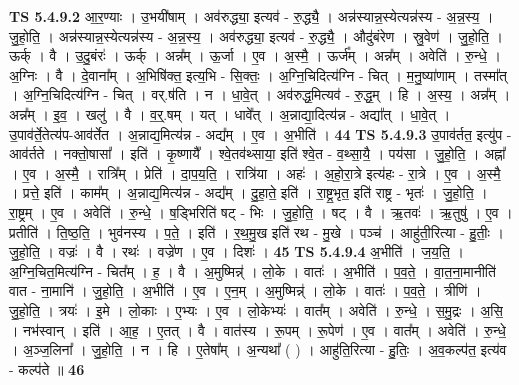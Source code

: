 \documentclass[17pt]{extarticle}
\begin{document}
                  \newline
                                \textbf{ TS 5.4.9.2} \newline
                  आ॒र॒ण्याः । उ॒भयी॑षाम् । अव॑रुद्ध्या॒ इत्यव॑ - रु॒द्ध्यै॒ । अन्न॑स्यान्न॒स्येत्यन्न॑स्य - अ॒न्न॒स्य॒ । जु॒हो॒ति॒ । अन्न॑स्यान्न॒स्येत्यन्न॑स्य - अ॒न्न॒स्य॒ । अव॑रुद्ध्या॒ इत्यव॑ - रु॒द्ध्यै॒ । औदु॑बंरेण । स्रु॒वेण॑ । जु॒हो॒ति॒ । ऊर्क् । वै । उ॒दु॒बंरः॑ । ऊर्क् । अन्न᳚म् । ऊ॒र्जा । ए॒व । अ॒स्मै॒ । ऊर्ज᳚म् । अन्न᳚म् । अवेति॑ । रु॒न्धे॒ । अ॒ग्निः । वै । दे॒वाना᳚म् । अ॒भिषि॑क्त॒ इत्य॒भि - सि॒क्तः॒ । अ॒ग्नि॒चिदित्य॑ग्नि - चित् । म॒नु॒ष्या॑णाम् । तस्मा᳚त् । अ॒ग्नि॒चिदित्य॑ग्नि - चित् । वर्.ष॑ति । न । धा॒वे॒त् । अव॑रुद्ध॒मित्यव॑ - रु॒द्ध॒म् । हि । अ॒स्य॒ । अन्न᳚म् । अन्न᳚म् । इ॒व॒ । खलु॑ । वै । व॒र्॒.षम् । यत् । धावे᳚त् । अ॒न्नाद्या॒दित्य॑न्न - अद्या᳚त् । धा॒वे॒त् । उ॒पाव॑र्ते॒तेत्य॑प-आव॑र्तेत । अ॒न्नाद्य॒मित्य॑न्न - अद्य᳚म् । ए॒व । अ॒भीति॑ । \textbf{  44} \newline
                  \newline
                                \textbf{ TS 5.4.9.3} \newline
                  उ॒पाव॑र्तत॒ इत्यु॑प - आव॑र्तते । नक्तो॒षासा᳚ । इति॑ । कृ॒ष्णायै᳚ । श्वे॒तव॑थ्साया॒ इति॑ श्वे॒त - व॒थ्सा॒यै॒ । पय॑सा । जु॒हो॒ति॒ । अह्ना᳚ । ए॒व । अ॒स्मै॒ । रात्रि᳚म् । प्रेति॑ । दा॒प॒य॒ति॒ । रात्रि॑या । अहः॑ । अ॒हो॒रा॒त्रे इत्य॑हः - रा॒त्रे । ए॒व । अ॒स्मै॒ । प्रत्ते॒ इति॑ । काम᳚म् । अ॒न्नाद्य॒मित्य॑न्न - अद्य᳚म् । दु॒हा॒ते॒ इति॑ । रा॒ष्ट्र॒भृत॒ इति॑ राष्ट्र - भृतः॑ । जु॒हो॒ति॒ । रा॒ष्ट्रम् । ए॒व । अवेति॑ । रु॒न्धे॒ । ष॒ड्भिरिति॑ षट् - भिः । जु॒हो॒ति॒ । षट् । वै । ऋ॒तवः॑ । ऋ॒तुषु॑ । ए॒व । प्रतीति॑ । ति॒ष्ठ॒ति॒ । भुव॑नस्य । प॒ते॒ । इति॑ । र॒थ॒मु॒ख इति॑ रथ - मु॒खे । पञ्च॑ । आहु॑ती॒रित्या - हु॒तीः॒ । जु॒हो॒ति॒ । वज्रः॑ । वै । रथः॑ । वज्रे॑ण । ए॒व । दिशः॑ । \textbf{  45} \newline
                  \newline
                                \textbf{ TS 5.4.9.4} \newline
                  अ॒भीति॑ । ज॒य॒ति॒ । अ॒ग्नि॒चित॒मित्य॑ग्नि - चित᳚म् । ह॒ । वै । अ॒मुष्मिन्न्॑ । लो॒के । वातः॑ । अ॒भीति॑ । प॒व॒ते॒ । वा॒त॒ना॒मानीति॑ वात - ना॒मानि॑ । जु॒हो॒ति॒ । अ॒भीति॑ । ए॒व । ए॒न॒म् । अ॒मुष्मिन्न्॑ । लो॒के । वातः॑ । प॒व॒ते॒ । त्रीणि॑ । जु॒हो॒ति॒ । त्रयः॑ । इ॒मे । लो॒काः । ए॒भ्यः । ए॒व । लो॒केभ्यः॑ । वात᳚म् । अवेति॑ । रु॒न्धे॒ । स॒मु॒द्रः । अ॒सि॒ । नभ॑स्वान् । इति॑ । आ॒ह॒ । ए॒तत् । वै । वात॑स्य । रू॒पम् । रू॒पेण॑ । ए॒व । वात᳚म् । अवेति॑ । रु॒न्धे॒ । अ॒ञ्ज॒लिना᳚ । जु॒हो॒ति॒ । न । हि । ए॒तेषा᳚म् । अ॒न्यथा᳚ ( ) । आहु॑ति॒रित्या - हु॒तिः॒ । अ॒व॒कल्प॑त॒ इत्य॑व - कल्प॑ते ॥ \textbf{  46} \newline
\end{document}
